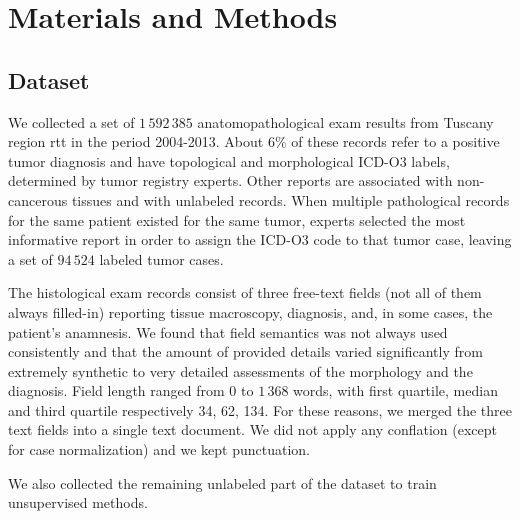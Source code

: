 \chapter{Materials and Methods}

\section{Dataset}
\label{sec:dataset}
We collected a set of $1\,592\,385$ anatomopathological exam results
from Tuscany region \ac{rtt} in the period 2004-2013. About $6\%$
of these records refer to a positive tumor
diagnosis and have topological and morphological ICD-O3 labels,
determined by tumor registry experts. Other reports are associated
with non-cancerous tissues and with unlabeled records. When multiple
pathological records for the
same patient existed for the same tumor, experts selected the most
informative report in order to assign the ICD-O3 code to that tumor
case, leaving a set of $94\,524$ labeled tumor cases.

The histological exam records consist of three free-text fields (not all
of them always filled-in) reporting tissue macroscopy, diagnosis,
and, in some cases, the patient's anamnesis. We found that field
semantics was not always used consistently and that the amount of
provided details varied significantly from extremely synthetic to very
detailed assessments of the morphology and the diagnosis. Field length
ranged from $0$ to $1\,368$ words, with first quartile, median and
third quartile respectively 34, 62, 134. For these reasons, we merged
the three text fields
into a single text document. We did not apply any conflation (except for
case normalization) and we kept punctuation.

We also collected the remaining unlabeled part of the dataset to train
unsupervised methods.

